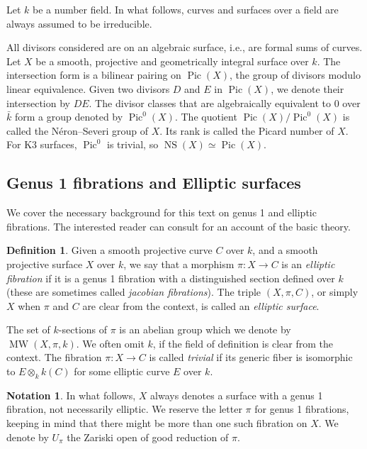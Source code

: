 \documentclass{amsart}
\theoremstyle{definition}
\newtheorem{definition}[theorem]{Definition}
\newtheorem{notation}[theorem]{Notation}
\numberwithin{equation}{section}
\DeclareMathOperator{\Pic}{Pic}
\DeclareMathOperator{\NS}{NS}
\DeclareMathOperator{\MW}{MW}
\begin{document}
Let $k$ be a number field. In what follows, curves and surfaces over a field are always assumed to be irreducible. 

All divisors considered are on an algebraic surface, i.e., are formal sums of curves. Let $X$ be a smooth, projective and geometrically integral surface over $k$. The intersection form is a bilinear pairing on $\Pic(X)$, the group of divisors modulo linear equivalence. Given two divisors $D$ and $E$ in $\Pic(X)$, we denote their intersection by $DE$. The divisor classes that are algebraically equivalent to 0 over $\bar{k}$ form a group denoted by $\Pic^0(X)$. The quotient $\Pic (X)/ \Pic^0(X)$ is called the N\'eron--Severi group of $X$. Its rank is called the Picard number of $X$. For K3 surfaces, $\Pic^0$ is trivial, so $\NS(X) \simeq \Pic(X)$. 


\subsection{Genus 1 fibrations and Elliptic surfaces}

We cover the necessary background for this text on genus 1 and elliptic fibrations. The interested reader can consult \cite{Mi} for an account of the basic theory.

\begin{definition}
Given a smooth projective curve $C$ over $k$, and a smooth projective surface $X$ over $k$, we say that a morphism $\pi:X\to C$ is an \textit{elliptic fibration} if it is a genus 1 fibration with a distinguished section defined over $k$ (these are sometimes called \textit{jacobian fibrations}). The triple $(X,\pi, C)$, or simply $X$ when $\pi$ and $C$ are clear from the context, is called an \textit{elliptic surface}.
\end{definition}

The set of $k$-sections of $\pi$ is an abelian group which we denote by $\MW(X,\pi,k)$. We often omit $k$, if the field of definition is clear from the context. The fibration $\pi:X\to C$ is called \textit{trivial} if its generic fiber is isomorphic to $E\otimes_k k(C)$ for some elliptic curve $E$ over $k$.

\begin{notation}
In what follows,  $X$ always denotes a surface with a genus 1 fibration, not necessarily elliptic. We reserve the letter $\pi$ for genus 1 fibrations, keeping in mind that there might be more than one such fibration on $X$. We denote by $U_\pi$ the Zariski open of good reduction of $\pi$.
\end{notation}
\end{document}
